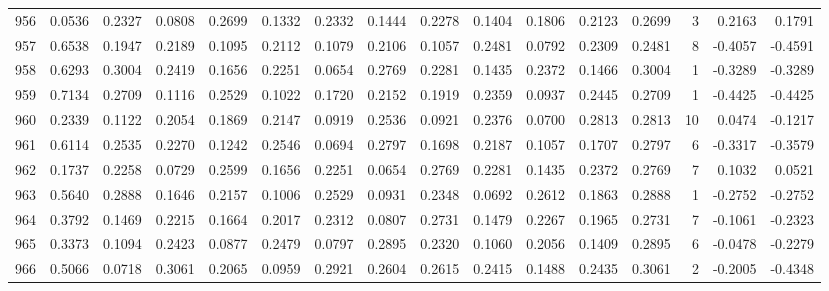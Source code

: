 \begin{tabular}{lrrrrrrrrrrrrrrr}
956 &      0.0536 &  0.2327 &  0.0808 &  0.2699 &  0.1332 &  0.2332 &  0.1444 &  0.2278 &  0.1404 &  0.1806 &   0.2123 &     0.2699 &      3 &                    0.2163 &                     0.1791 \\
957 &      0.6538 &  0.1947 &  0.2189 &  0.1095 &  0.2112 &  0.1079 &  0.2106 &  0.1057 &  0.2481 &  0.0792 &   0.2309 &     0.2481 &      8 &                   -0.4057 &                    -0.4591 \\
958 &      0.6293 &  0.3004 &  0.2419 &  0.1656 &  0.2251 &  0.0654 &  0.2769 &  0.2281 &  0.1435 &  0.2372 &   0.1466 &     0.3004 &      1 &                   -0.3289 &                    -0.3289 \\
959 &      0.7134 &  0.2709 &  0.1116 &  0.2529 &  0.1022 &  0.1720 &  0.2152 &  0.1919 &  0.2359 &  0.0937 &   0.2445 &     0.2709 &      1 &                   -0.4425 &                    -0.4425 \\
960 &      0.2339 &  0.1122 &  0.2054 &  0.1869 &  0.2147 &  0.0919 &  0.2536 &  0.0921 &  0.2376 &  0.0700 &   0.2813 &     0.2813 &     10 &                    0.0474 &                    -0.1217 \\
961 &      0.6114 &  0.2535 &  0.2270 &  0.1242 &  0.2546 &  0.0694 &  0.2797 &  0.1698 &  0.2187 &  0.1057 &   0.1707 &     0.2797 &      6 &                   -0.3317 &                    -0.3579 \\
962 &      0.1737 &  0.2258 &  0.0729 &  0.2599 &  0.1656 &  0.2251 &  0.0654 &  0.2769 &  0.2281 &  0.1435 &   0.2372 &     0.2769 &      7 &                    0.1032 &                     0.0521 \\
963 &      0.5640 &  0.2888 &  0.1646 &  0.2157 &  0.1006 &  0.2529 &  0.0931 &  0.2348 &  0.0692 &  0.2612 &   0.1863 &     0.2888 &      1 &                   -0.2752 &                    -0.2752 \\
964 &      0.3792 &  0.1469 &  0.2215 &  0.1664 &  0.2017 &  0.2312 &  0.0807 &  0.2731 &  0.1479 &  0.2267 &   0.1965 &     0.2731 &      7 &                   -0.1061 &                    -0.2323 \\
965 &      0.3373 &  0.1094 &  0.2423 &  0.0877 &  0.2479 &  0.0797 &  0.2895 &  0.2320 &  0.1060 &  0.2056 &   0.1409 &     0.2895 &      6 &                   -0.0478 &                    -0.2279 \\
966 &      0.5066 &  0.0718 &  0.3061 &  0.2065 &  0.0959 &  0.2921 &  0.2604 &  0.2615 &  0.2415 &  0.1488 &   0.2435 &     0.3061 &      2 &                   -0.2005 &                    -0.4348 \\

\end{tabular}
